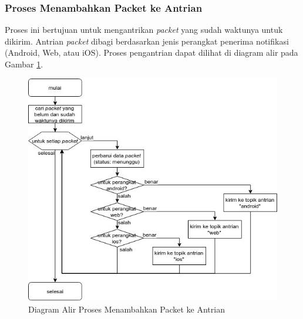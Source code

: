 \subsubsection{Proses Menambahkan Packet ke Antrian}
\label{3:proses_menambahkan_packet_ke_antrian}
\par Proses ini bertujuan untuk mengantrikan \textit{packet} yang sudah waktunya untuk dikirim.
Antrian \textit{packet} dibagi berdasarkan jenis perangkat penerima notifikasi (Android, Web, atau iOS). Proses pengantrian dapat dilihat di diagram alir pada Gambar \ref{flowchart_menambahkan_packet_ke_antrian}.
\begin{figure}[H]
    \centering\includegraphics[width=1\textwidth]{bab3/img/flowchart-menambahkan_packet_ke_antrian.jpg}
    \caption{Diagram Alir Proses Menambahkan Packet ke Antrian} \label{flowchart_menambahkan_packet_ke_antrian}
\end{figure}
\clearpage

